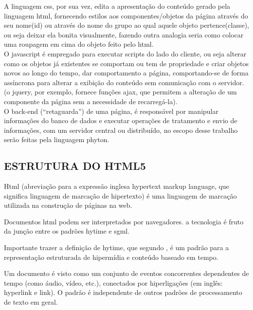 \begin{description}
			A linguagem css, por sua vez, edita a apresentação do conteúdo gerado pela linguagem html, fornecendo estilos aos componentes/objetos da página através do seu nome(id) ou através do nome do grupo ao qual aquele objeto pertence(classe), ou seja deixar ela bonita visualmente, fazendo outra analogia seria como colocar uma roupagem em cima do objeto feito pelo html.
			\cite{silva2007construindo}\\
						
			O javascript é empregado para executar scripts do lado do cliente, ou seja alterar como os objetos já existentes se comportam ou tem de propriedade e criar objetos novos ao longo do tempo, dar comportamento a página, comportando-se de forma assíncrona para alterar a exibição do conteúdo sem comunicação com o servidor. (o jquery, por exemplo, fornece funções ajax, que permitem a alteração de um componente da página sem a necessidade de recarregá-la). \cite{perez2019introduccion}\\
				
			O back-end (“retaguarda”) de uma página, é responsável por manipular informações do banco de dados e executar operações de tratamento e envio de informações, com um servidor central ou distribuído, no escopo desse trabalho serão feitas pela linguagem phyton. 
			\cite{alura}			
	\end{description} 	
	  
	\subsection{ESTRUTURA DO HTML5}
	\label{subsec:ESTRUTURAHTML5}
	
	Html (abreviação para a expressão inglesa hypertext markup language, que significa linguagem de marcação de hipertexto) é uma linguagem de marcação utilizada na construção de páginas na web.  \cite{silva2007construindo1}
	
	Documentos html podem ser interpretados por navegadores. a tecnologia é fruto da junção  entre os padrões hytime e sgml. \cite{silva2007construindo1}	
		
	Importante trazer a definição de hytime, que segundo \cite{carr1994use},  é um padrão para a representação estruturada de hipermídia e conteúdo baseado em tempo.
	
	Um documento é visto como um conjunto de eventos concorrentes dependentes de tempo (como áudio, vídeo, etc.), conectados por hiperligações (em inglês: hyperlink e link). O padrão é independente de outros padrões de processamento de texto em geral.
	\cite{carr1994use} 
	

